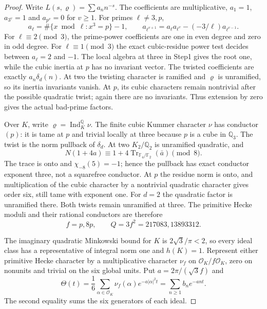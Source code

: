 \begin{proof}
Write $L(s,\varrho)=\sum a_n n^{-s}$.
The coefficients are multiplicative, $a_1=1$,
$a_{3^v}=1$ and $a_{p^v}=0$ for $v\ge1$.
For primes $\ell\ne3,p$,
\[
 a_\ell=\#\{x\bmod\ell:x^3=p\}-1,\qquad
 a_{\ell^{v+1}}=a_\ell a_{\ell^v}-(-3/\ell)a_{\ell^{v-1}}.
 \tag{G150C.21}
\]
For $\ell\equiv2\pmod3$, the prime-power coefficients are
one in even degree and zero in odd degree.
For $\ell\equiv1\pmod3$ the exact cubic-residue power test
decides between $a_\ell=2$ and $-1$.
The local algebra at three in Step1 gives the root one,
while the cubic inertia at $p$ has no invariant vector.
The twisted coefficients are exactly $a_n\delta_d(n)$.
At two the twisting character is ramified and $\varrho$ is
unramified, so its inertia invariants vanish.
At $p$, its cubic characters remain nontrivial after the
possible quadratic twist; again there are no invariants.
Thus extension by zero gives the actual bad-prime factors.

Over $K$, write $\varrho=\operatorname{Ind}_K^{\mathbb Q}\nu$.
The finite cubic Kummer character $\nu$ has conductor $(p)$:
it is tame at $p$ and trivial locally at three because $p$
is a cube in $\mathbb Q_3$.
The twist is the norm pullback of $\delta_d$.
At two $K_2/\mathbb Q_2$ is unramified quadratic, and
\[
 N(1+4a)\equiv1+4\operatorname{Tr}_{\mathbb F_4/\mathbb F_2}
                                      (\bar a)\pmod8.
 \tag{G150C.22}
\]
The trace is onto and $\chi_{-8}(5)=-1$; hence the pullback
has exact conductor exponent three, not a squarefree conductor.
At $p$ the residue norm is onto, and multiplication of the
cubic character by a nontrivial quadratic character gives
order six, still tame with exponent one.
For $d=2$ the quadratic factor is unramified there.
Both twists remain unramified at three.
The primitive Hecke moduli and their rational conductors are therefore
\[
                    f=p,8p,\qquad Q=3f^2=217083,13893312.
 \tag{G150C.23}
\]

The imaginary quadratic Minkowski bound for $K$ is
$2\sqrt3/\pi<2$, so every ideal class has a representative of
integral norm one and $h(K)=1$.
Represent either primitive Hecke character by a multiplicative
character $\nu_f$ on $\mathcal O_K/f\mathcal O_K$, zero on
nonunits and trivial on the six global units.
Put $a=2\pi/(\sqrt3 f)$ and
\[
 \Theta(t)=\frac16\sum_{\alpha\in\mathcal O_K}
       \nu_f(\alpha)e^{-a|\alpha|^2t}
            =\sum_{n\ge1}b_ne^{-ant}.
 \tag{G150C.24}
\]
The second equality sums the six generators of each ideal.


\end{proof}

